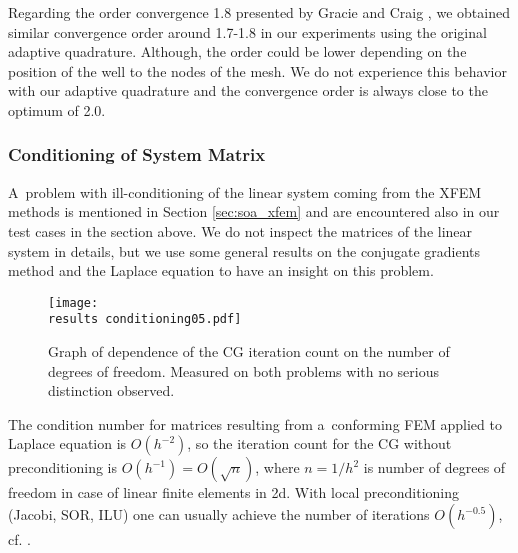 Regarding the order convergence 1.8 presented by Gracie and Craig \cite{gracie_modelling_2010}, we obtained similar convergence order 
around 1.7-1.8 in our experiments using the original adaptive quadrature. Although, the order could be lower 
depending on the position of the well to the nodes of the mesh. We do not experience this behavior with our adaptive
quadrature and the convergence order is always close to the optimum of 2.0.




\subsubsection{Conditioning of System Matrix} \label{sec:res_conditioning}
A~problem with ill-conditioning of the linear system coming from the XFEM methods is mentioned in Section \ref{sec:soa_xfem}
and are encountered also in our test cases in the section above. We do not inspect the matrices of the linear system in details, 
but we use some general results on the conjugate gradients method and the Laplace equation to have an insight on this problem.

\begin{figure}[!htb]
  \centering    
    \texttt{[image: \\results conditioning05.pdf]}
  \caption[CG iterations count in Test case 3]{Graph of dependence of the CG iteration count on the 
  number of degrees of freedom. Measured on both problems with no serious distinction observed.}
  \label{fig:conditioning05}
\end{figure}
%

The condition number for matrices resulting from a~conforming FEM applied to Laplace equation is $O(h^{-2})$, so the iteration count 
for the CG without preconditioning is $O(h^{-1})=O(\sqrt{n})$, where $n=1/h^2$ is number of degrees of freedom in case of linear finite elements in 2d. 
With local preconditioning (Jacobi, SOR, ILU) one can usually achieve the number of iterations $O(h^{-0.5})$, cf. \cite{ern_evaluation_2006}.


